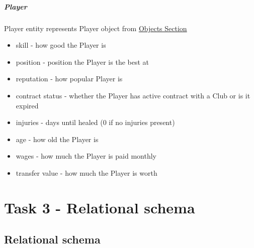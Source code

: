 \documentclass{report}
\begin{document}
\paragraph{Player}
Player entity represents Player object from \hyperref[Objects Section]{Objects Section}
\begin{itemize}
    \item skill - how good the Player is
    \item position - position the Player is the best at
    \item reputation - how popular Player is
    \item contract status - whether the Player has active contract with a Club or is it expired
    \item injuries - days until healed (0 if no injuries present)
    \item age - how old the Player is
    \item wages - how much the Player is paid monthly
    \item transfer value - how much the Player is worth
\end{itemize}

\chapter{Task 3 - Relational schema}
\section{Relational schema}

\end{document}
